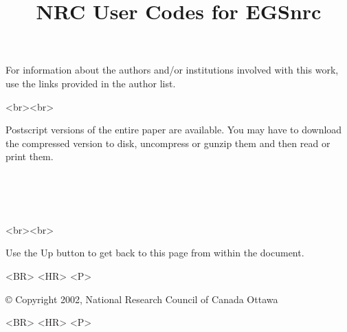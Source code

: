 \documentclass[12pt,twoside]{article}  %
\begin{document}
\begin{htmlonly}
For information about the authors and/or institutions involved with this
work, use the links provided in the author list.\\

\begin{rawhtml}
<br><br>
\end{rawhtml}


Postscript versions of the entire paper are available.  You may have to
download the compressed version to disk, uncompress or gunzip them and
then read or print them.\\
\begin{center}
\\
\\
\\
\end{center}
\begin{rawhtml}
<br><br>
\end{rawhtml}

Use the Up button to get back to this page from within the document.
\begin{rawhtml}
<BR> <HR> <P>
\end{rawhtml}
\copyright 
Copyright 2002,  National Research Council of Canada
Ottawa
\begin{rawhtml}
<BR> <HR> <P>
\end{rawhtml}
\end{htmlonly}

\pagestyle{empty}

\title{NRC User Codes for EGSnrc}
\end{document}
